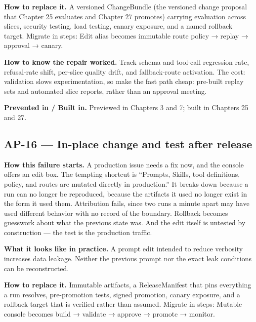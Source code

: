 \textbf{How to replace it.} A versioned ChangeBundle (the versioned change proposal that Chapter 25 evaluates and Chapter 27 promotes) carrying evaluation across slices, security testing, load testing, canary exposure, and a named rollback target. Migrate in steps: Edit alias becomes immutable route policy → replay → approval → canary.\par

\textbf{How to know the repair worked.} Track schema and tool-call regression rate, refusal-rate shift, per-slice quality drift, and fallback-route activation. The cost: validation slows experimentation, so make the fast path cheap: pre-built replay sets and automated slice reports, rather than an approval meeting.\par

\textbf{Prevented in / Built in.} Previewed in Chapters 3 and 7; built in Chapters 25 and 27.\par

\subsection{AP-16 — In-place change and test after release}

\textbf{How this failure starts.} A production issue needs a fix now, and the console offers an edit box. The tempting shortcut is “Prompts, Skills, tool definitions, policy, and routes are mutated directly in production.” It breaks down because a run can no longer be reproduced, because the artifacts it used no longer exist in the form it used them. Attribution fails, since two runs a minute apart may have used different behavior with no record of the boundary. Rollback becomes guesswork about what the previous state was. And the edit itself is untested by construction — the test is the production traffic.\par

\textbf{What it looks like in practice.} A prompt edit intended to reduce verbosity increases data leakage. Neither the previous prompt nor the exact leak conditions can be reconstructed.\par

\textbf{How to replace it.} Immutable artifacts, a ReleaseManifest that pins everything a run resolves, pre-promotion tests, signed promotion, canary exposure, and a rollback target that is verified rather than assumed. Migrate in steps: Mutable console becomes build → validate → approve → promote → monitor.\par

